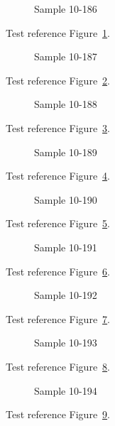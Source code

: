 \begin{figure}[tbhp]
\caption{Sample 10-186}
\label{fig:sample-10-186}
\end{figure}

Test reference Figure~\ref{fig:sample-10-186}.

\begin{figure}[tbhp]
\caption{Sample 10-187}
\label{fig:sample-10-187}
\end{figure}

Test reference Figure~\ref{fig:sample-10-187}.

\begin{figure}[tbhp]
\caption{Sample 10-188}
\label{fig:sample-10-188}
\end{figure}

Test reference Figure~\ref{fig:sample-10-188}.

\begin{figure}[tbhp]
\caption{Sample 10-189}
\label{fig:sample-10-189}
\end{figure}

Test reference Figure~\ref{fig:sample-10-189}.

\begin{figure}[tbhp]
\caption{Sample 10-190}
\label{fig:sample-10-190}
\end{figure}

Test reference Figure~\ref{fig:sample-10-190}.

\begin{figure}[tbhp]
\caption{Sample 10-191}
\label{fig:sample-10-191}
\end{figure}

Test reference Figure~\ref{fig:sample-10-191}.

\begin{figure}[tbhp]
\caption{Sample 10-192}
\label{fig:sample-10-192}
\end{figure}

Test reference Figure~\ref{fig:sample-10-192}.

\begin{figure}[tbhp]
\caption{Sample 10-193}
\label{fig:sample-10-193}
\end{figure}

Test reference Figure~\ref{fig:sample-10-193}.

\begin{figure}[tbhp]
\caption{Sample 10-194}
\label{fig:sample-10-194}
\end{figure}

Test reference Figure~\ref{fig:sample-10-194}.

